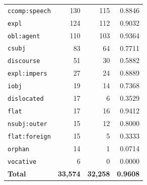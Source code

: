 \begin{table}[ht]
\begin{tabular}{lrrr}
\texttt{ccomp\!:\!speech} & 130 & 115 & 0.8846 \\
\texttt{expl} & 124 & 112 & 0.9032 \\
\texttt{obl\!:\!agent} & 110 & 103 & 0.9364 \\
\texttt{csubj} & 83 & 64 & 0.7711 \\
\texttt{discourse} & 51 & 30 & 0.5882 \\
\texttt{expl\!:\!impers} & 27 & 24 & 0.8889 \\
\texttt{iobj} & 19 & 14 & 0.7368 \\
\texttt{dislocated} & 17 & 6 & 0.3529 \\
\texttt{flat} & 17 & 16 & 0.9412 \\
\texttt{nsubj\!:\!outer} & 15 & 12 & 0.8000 \\
\texttt{flat\!:\!foreign} & 15 & 5 & 0.3333 \\
\texttt{orphan} & 14 & 1 & 0.0714 \\
\texttt{vocative} & 6 & 0 & 0.0000 \\
\midrule
\textbf{Total} & \textbf{33,574} & \textbf{32,258} & \textbf{0.9608} \\
\bottomrule
\end{tabular}
\end{table}
